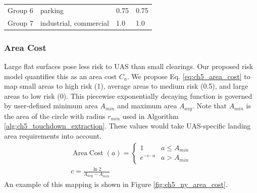 \begin{table}[!ht]
\begin{tabular}{p{1.5cm}p{4.7cm}p{1.6cm}p{1.7cm}}
Group 6 & parking                                                                                                                        & 0.75 & 0.75 \\ %
Group 7 & industrial, commercial                                                                                                         & 1.0 & 1.0 \\ %
\end{tabular}
\end{table}

\subsubsection{Area Cost}
Large flat surfaces pose less risk to \ac{UAS} than small clearings. Our proposed risk model quantifies this as an area cost $C_a$. We propose Eq. \ref{eq:ch5_area_cost} to map small areas to high risk (1), average areas to medium risk (0.5), and large areas to low risk (0). This piecewise exponentially decaying function is governed by user-defined minimum area $A_{min}$ and maximum area $A_{avg}$.  Note that $A_{min}$ is the area of the circle with radius $r_{min}$ used in Algorithm \ref{alg:ch5_touchdown_extraction}. These values would take UAS-specific landing area requirements into account.
\begin{align}\label{eq:ch5_area_cost}
    \operatorname{Area\; Cost} (a) = \begin{cases} 
       1 & a \leq A_{min} \\
       e^{-c \cdot a} &  a > A_{min}
   \end{cases} \\
   c = \frac{\ln{2}}{A_{avg}- A_{min}}
\end{align}
An example of this mapping is shown in Figure \ref{fig:ch5_ny_area_cost}.

